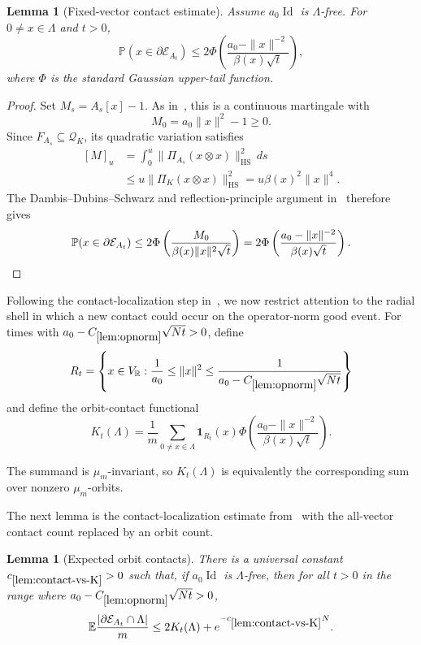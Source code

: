 \documentclass[11pt]{article}
\newtheorem{lemma}[theorem]{Lemma}
\theoremstyle{remark}
\newcommand{\R}{\mathbb R}
\newcommand{\Id}{\operatorname{Id}}
\newcommand{\E}{\mathbb E}
\newcommand{\Prob}{\mathbb P}
\newcommand{\HS}{\operatorname{HS}}
\newcommand{\calE}{\mathcal E}
\begin{document}
\begin{lemma}[Fixed-vector contact estimate]\label{lem:fixed-contact}
Assume $a_0\Id$ is $\Lambda$-free.  For $0\ne x\in\Lambda$ and $t>0$,
\[
        \Prob(x\in\partial\calE_{A_t})
        \le
        2\Phi\left(
        \frac{a_0-\|x\|^{-2}}{\beta(x)\sqrt t}
        \right),
\]
where $\Phi$ is the standard Gaussian upper-tail function.
\end{lemma}

\begin{proof}
Set $M_s=A_s[x]-1$.  As in~\cite{Klartag}, this is a continuous martingale with
\[
        M_0=a_0\|x\|^2-1
        \ge0.
\]
Since $F_{A_s}\subseteq\mathcal Q_K$, its quadratic variation satisfies
\[
\begin{aligned}
        [M]_u
        &=\int_0^u\|\Pi_{A_s}(x\otimes x)\|_{\HS}^2\,ds \\
        &\le u\|\Pi_K(x\otimes x)\|_{\HS}^2
        =u\beta(x)^2\|x\|^4.
\end{aligned}
\]
The Dambis--Dubins--Schwarz and reflection-principle argument
in~\cite{Klartag} therefore gives
\[
        \Prob(x\in\partial\calE_{A_t})
        \le2\Phi\left(\frac{M_0}{\beta(x)\|x\|^2\sqrt t}\right)
        =2\Phi\left(
        \frac{a_0-\|x\|^{-2}}{\beta(x)\sqrt t}
        \right).\qedhere
\]
\end{proof}

Following the contact-localization step in~\cite[Proposition~4.2]{Klartag}, we now restrict
attention to the radial shell in which a new contact could occur on the
operator-norm good event.  For times with
$a_0-C_{\ref{lem:opnorm}}\sqrt{Nt}>0$, define
\[
        R_t=\left\{x\in V_\R:
        \frac1{a_0}\le\|x\|^2\le
        \frac1{a_0-C_{\ref{lem:opnorm}}\sqrt{Nt}}
        \right\}
\]
and define the orbit-contact functional
\begin{equation}
        K_t(\Lambda)=
        \frac1m\sum_{0\ne x\in\Lambda}\mathbf 1_{R_t}(x)
        \Phi\left(
        \frac{a_0-\|x\|^{-2}}{\beta(x)\sqrt t}
        \right).
\label{eq:Kt}
\end{equation}

The summand is $\mu_m$-invariant, so $K_t(\Lambda)$ is equivalently the
corresponding sum over nonzero $\mu_m$-orbits.

The next lemma is the contact-localization estimate
from~\cite{Klartag} with
the all-vector contact count replaced by an orbit count.

\begin{lemma}[Expected orbit contacts]\label{lem:contact-vs-K}
There is a universal constant $c_{\ref{lem:contact-vs-K}}>0$ such that, if
$a_0\Id$ is $\Lambda$-free, then for all $t>0$ in the range where
$a_0-C_{\ref{lem:opnorm}}\sqrt{Nt}>0$,
\[
        \E
        \frac{|\partial\calE_{A_t}\cap\Lambda|}{m}
        \le 2K_t(\Lambda)+e^{-c_{\ref{lem:contact-vs-K}}N}.
\]
\end{lemma}
\end{document}
